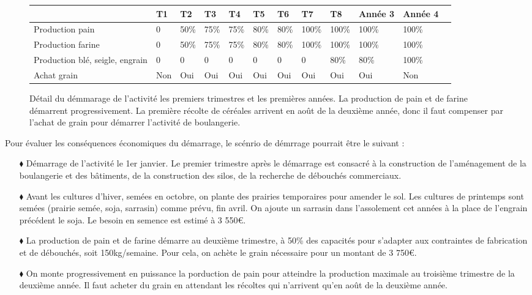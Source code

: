 \documentclass{book}
\begin{document}
\begin{figure}[h!]
\footnotesize
\center
\begin{tabular}{ | p{} | p{}| p{}| p{}| p{}| p{}| p{}| p{}| p{}| p{1.2cm}| p{1.2cm}| }
\hline
	& T1 & T2 & T3 & T4 & T5 & T6 & T7 & T8 & Année 3 & Année 4 \  \\ \hline
	Production pain & 0 & 50\% & 75\% & 75\% & 80\% & 80\% & 100\% & 100\% & 100\% & 100\% \\ \hline
	Production farine & 0 & 50\% & 75\% & 75\% & 80\% & 80\% & 100\% & 100\% & 100\% & 100\% \\ \hline
	Production blé, seigle, engrain & 0 & 0 & 0 & 0 & 0 & 0 & 0 & 80\% & 80\% & 100\% \\ \hline
	Achat grain & Non & Oui & Oui & Oui & Oui & Oui & Oui & Oui & Oui & Non \\ \hline
\end{tabular}
\caption{Détail du démmarage de l'activité les premiers trimestres et les premières années. La production de pain et de farine démarrent progressivement. La première récolte de céréales arrivent en août de la deuxième année, donc il faut compenser par l'achat de grain pour démarrer l'activité de boulangerie.}
\label{tab:demarrage_temp}
\end{figure}

Pour évaluer les conséquences économiques du démarrage, le scénrio de démrrage pourrait être le suivant :
\begin{itemize}

\item[$\blacklozenge$] Démarrage de l'activité le 1er janvier. Le premier trimestre après le démarrage est consacré à la construction de l'aménagement de la boulangerie et des bâtiments, de la construction des silos, de la recherche de débouchés commerciaux.

\item[$\blacklozenge$] Avant les cultures d'hiver, semées en octobre, on plante des prairies temporaires pour amender le sol. Les cultures de printemps sont semées (prairie semée, soja, sarrasin) comme prévu, fin avril. On ajoute un sarrasin dans l'assolement cet années à la place de l'engrain précédent le soja. Le besoin en semence est estimé à 3 550\euro{}.

\item[$\blacklozenge$] La production de pain et de farine démarre au deuxième trimestre, à 50\% des capacités pour s'adapter aux contraintes de fabrication et de débouchés, soit 150kg/semaine. Pour cela, on achète le grain nécessaire pour un montant de 3 750\euro{}.

\item[$\blacklozenge$] On monte progressivement en puissance la porduction de pain pour atteindre la production maximale au troisième trimestre de la deuxième année. Il faut acheter du grain en attendant les récoltes qui n'arrivent qu'en août de la deuxième année.

\end{itemize}
\end{document}
